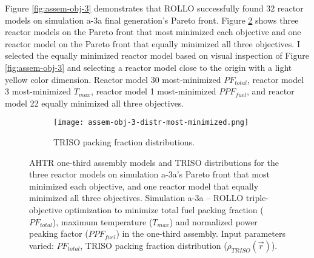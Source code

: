 Figure \ref{fig:assem-obj-3} demonstrates that \gls{ROLLO} successfully found 32 
reactor models on simulation a-3a final generation's Pareto front. 
Figure \ref{fig:assem-obj-3-most-minimized} shows three reactor models on the 
Pareto front that most minimized each objective and one reactor model on the 
Pareto front that equally minimized all three objectives. 
I selected the equally minimized reactor model based on visual inspection of Figure 
\ref{fig:assem-obj-3} and selecting a reactor model close to the origin 
with a light yellow color dimension. 
Reactor model 30 most-minimized $PF_{total}$, reactor model 3 most-minimized $T_{max}$, 
reactor model 1 most-minimized $PPF_{fuel}$, and reactor model 22 equally minimized 
all three objectives. 
\begin{figure}[htbp!]
    \centering
    \begin{subfigure}{\textwidth}
    \centering
    \texttt{[image: assem-obj-3-distr-most-minimized.png]}
    \caption{TRISO packing fraction distributions.}
    \label{fig:assem-obj-3-most-minimized-distr}
    \end{subfigure}
    \caption{AHTR one-third assembly models and TRISO distributions for the three reactor 
    models on simulation a-3a's Pareto front that most minimized each objective, and 
    one reactor model that equally minimized all three objectives.
    Simulation a-3a -- ROLLO triple-objective optimization to minimize total fuel packing 
    fraction ($PF_{total}$), maximum temperature ($T_{max}$) and 
    normalized power peaking factor ($PPF_{fuel}$) in the one-third assembly. 
    Input parameters varied: $PF_{total}$, TRISO packing fraction distribution
    ($\rho_{TRISO}(\vec{r})$).}
    \label{fig:assem-obj-3-most-minimized}
\end{figure}
